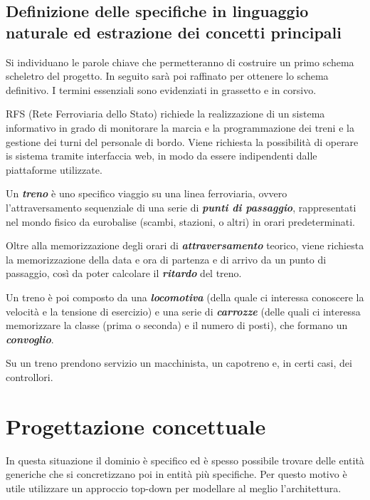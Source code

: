 \documentclass[a4paper,12pt]{report}
\begin{document}
	\section{Definizione delle specifiche in linguaggio naturale ed estrazione dei concetti principali}
	\par Si individuano le parole chiave che permetteranno di costruire un primo schema scheletro del progetto. In seguito sarà poi raffinato per ottenere lo schema definitivo. I termini essenziali sono evidenziati in grassetto e in corsivo.
	\par RFS (Rete Ferroviaria dello Stato) richiede la realizzazione di un sistema informativo in grado di monitorare la marcia e la programmazione dei treni e la gestione dei turni del personale di bordo. Viene richiesta la possibilità di operare is sistema tramite interfaccia web, in modo da essere indipendenti dalle piattaforme utilizzate.
	\par Un \textbf{\textit{treno}} è uno specifico viaggio su una linea ferroviaria, ovvero l'attraversamento sequenziale di una serie di \textbf{\textit{punti di passaggio}}, rappresentati nel mondo fisico da eurobalise (scambi, stazioni, o altri) in orari predeterminati.
	\par Oltre alla memorizzazione degli orari di \textbf{\textit{attraversamento}} teorico, viene richiesta la memorizzazione della data e ora di partenza e di arrivo da un punto di passaggio, così da poter calcolare il \textbf{\textit{ritardo}} del treno.
	\par Un treno è poi composto da una \textbf{\textit{locomotiva}} (della quale ci interessa conoscere la velocità e la tensione di esercizio) e una serie di \textbf{\textit{carrozze}} (delle quali ci interessa memorizzare la classe (prima o seconda) e il numero di posti), che formano un \textbf{\textit{convoglio}}.
	\par Su un treno prendono servizio un macchinista, un capotreno e, in certi casi, dei controllori.


	\chapter{Progettazione concettuale}
	\par In questa situazione il dominio è specifico ed è spesso possibile trovare delle entità generiche che si concretizzano poi in entità più specifiche. Per questo motivo è utile utilizzare un approccio top-down per modellare al meglio l'architettura.
\end{document}
